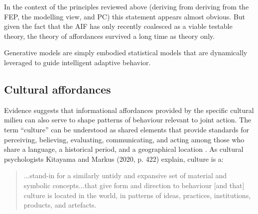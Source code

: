 \begin{CJK}{UTF8}{gbsn}
In the context of the principles reviewed above (deriving from deriving from the FEP, the modelling view, and PC) this statement appears almost obvious.  But given the fact that the AIF has only recently coalesced as a viable testable theory, the theory of affordances survived a long time as theory only.




Generative models are simply embodied statistical models that are dynamically leveraged to guide intelligent adaptive behavior.




            \subsection{Cultural affordances}







          Evidence suggests that informational affordances provided by the specific cultural milieu can also serve to shape patterns of behaviour relevant to joint action.  The term ``culture'' can be understood as shared elements that provide standards for perceiving, believing, evaluating, communicating, and acting among those who share a language, a historical period, and a geographical location \citep{Triandis1996}.  As cultural psychologists Kitayama and Markus (2020, p. 422) explain, culture is a:

          \begin{quote}
            ...stand-in for a similarly untidy and expansive set of material and symbolic concepts...that give form and direction to behaviour [and that] culture is located in the world, in patterns of ideas, practices, institutions, products, and artefacts.
          \end{quote}




\end{CJK}
